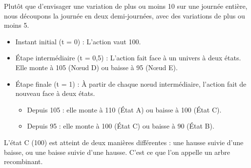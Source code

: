 \begin{examplebox}
Plutôt que d'envisager une variation de plus ou moins 10 sur une journée entière, nous découpons la journée en deux demi-journées, avec des variations de plus ou moins 5.
\begin{itemize}[label=$\rightarrow$]
    \item Instant initial (t = 0) : L'action vaut 100.
    \item Étape intermédiaire (t = 0,5) : L'action fait face à un univers à deux états. Elle monte à 105 (Nœud D) ou baisse à 95 (Nœud E).
    \item Étape finale (t = 1) : À partir de chaque nœud intermédiaire, l'action fait de nouveau face à deux états.
    \begin{itemize}[label=$\cdot$]
        \item Depuis 105 : elle monte à 110 (État A) ou baisse à 100 (État C).
        \item Depuis 95 : elle monte à 100 (État C) ou baisse à 90 (État B).
    \end{itemize}
\end{itemize}
L'état C (100) est atteint de deux manières différentes : une hausse suivie d'une baisse, ou une baisse suivie d'une hausse. C'est ce que l'on appelle un arbre recombinant.
\end{examplebox}

